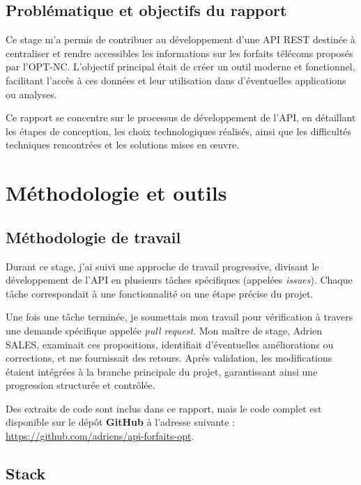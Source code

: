 \documentclass{article}
\begin{document}
	\subsection{Problématique et objectifs du rapport}
	
	Ce stage m’a permis de contribuer au développement d’une API REST destinée à centraliser et rendre accessibles les informations sur les forfaits télécoms proposés par l’OPT-NC. L’objectif principal était de créer un outil moderne et fonctionnel, facilitant l’accès à ces données et leur utilisation dans d’éventuelles applications ou analyses.
	
	Ce rapport se concentre sur le processus de développement de l’API, en détaillant les étapes de conception, les choix technologiques réalisés, ainsi que les difficultés techniques rencontrées et les solutions mises en œuvre.
	
	\newpage
	\section{Méthodologie et outils}
	
	\subsection{Méthodologie de travail}
	
	Durant ce stage, j'ai suivi une approche de travail progressive, divisant le développement de l'API en plusieurs tâches spécifiques (appelées \textit{issues}). Chaque tâche correspondait à une fonctionnalité ou une étape précise du projet.
	
	Une fois une tâche terminée, je soumettais mon travail pour vérification à travers une demande spécifique appelée \textit{pull request}. Mon maître de stage, Adrien SALES, examinait ces propositions, identifiait d'éventuelles améliorations ou corrections, et me fournissait des retours. Après validation, les modifications étaient intégrées à la branche principale du projet, garantissant ainsi une progression structurée et contrôlée.
	
	Des extraits de code sont inclus dans ce rapport, mais le code complet est disponible sur le dépôt \textbf{GitHub} à l'adresse suivante : \url{https://github.com/adriens/api-forfaits-opt}.
	
	\subsection{Stack}
	
\end{document}
